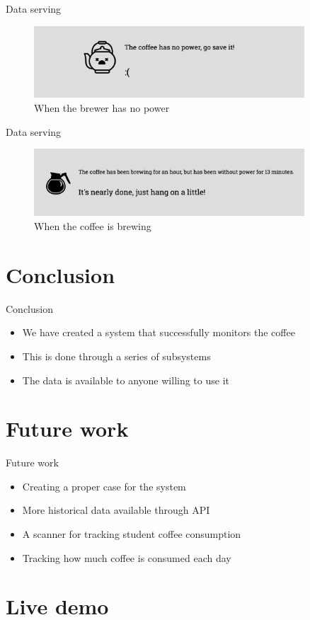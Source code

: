 \documentclass[presentation]{beamer}
\begin{document}
\begin{frame}[label={sec:org38b9286}]{Data serving}
\begin{figure}[htbp]
\centering
\includegraphics[width=0.9\textwidth]{./figures/nopower.png}
\caption{\label{fig:no-power}
When the brewer has no power}
\end{figure}
\end{frame}
\begin{frame}[label={sec:org06adcfe}]{Data serving}
\begin{figure}[htbp]
\centering
\includegraphics[width=0.9\textwidth]{./figures/brewing.png}
\caption{\label{fig:brewing}
When the coffee is brewing}
\end{figure}
\end{frame}
\section{Conclusion}
\label{sec:org672fb29}
\begin{frame}[label={sec:orge03c030}]{Conclusion}
\begin{itemize}
\item We have created a system that successfully monitors the coffee
\item This is done through a series of subsystems
\item The data is available to anyone willing to use it
\end{itemize}
\end{frame}
\section{Future work}
\label{sec:orgaae0d36}
\begin{frame}[label={sec:orgfb07108}]{Future work}
\begin{itemize}
\item Creating a proper case for the system
\item More historical data available through API
\item A scanner for tracking student coffee consumption
\item Tracking how much coffee is consumed each day
\end{itemize}
\end{frame}
\section{Live demo}
\label{sec:org71b2209}
\end{document}

